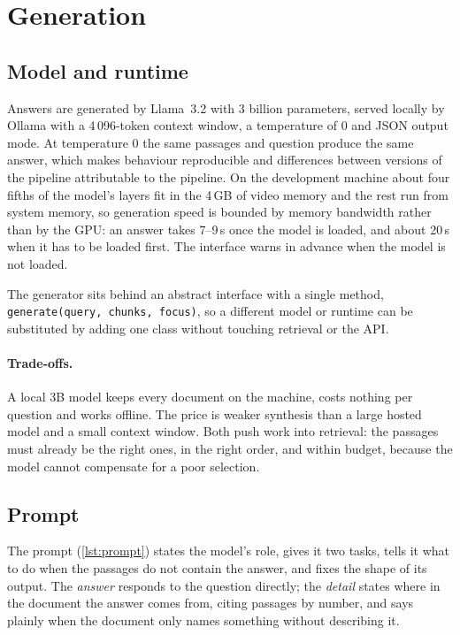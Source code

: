 \section{Generation}
\label{sec:generation}

\subsection{Model and runtime}

Answers are generated by Llama~3.2 with 3 billion parameters, served locally by
Ollama with a 4\,096-token context window, a temperature of 0 and JSON output
mode. At temperature 0 the same passages and question produce the same answer,
which makes behaviour reproducible and differences between versions of the
pipeline attributable to the pipeline. On the development machine about four
fifths of the model's layers fit in the 4\,GB of video memory and the rest run
from system memory, so generation speed is bounded by memory bandwidth rather
than by the GPU: an answer takes 7--9\,s once the model is loaded, and about
20\,s when it has to be loaded first. The interface warns in advance when the
model is not loaded.

The generator sits behind an abstract interface with a single method,
\texttt{generate(query, chunks, focus)}, so a different model or runtime can
be substituted by adding one class without touching retrieval or the API.

\paragraph{Trade-offs.} A local 3B model keeps every document on the machine,
costs nothing per question and works offline. The price is weaker synthesis
than a large hosted model and a small context window. Both push work into
retrieval: the passages must already be the right ones, in the right order,
and within budget, because the model cannot compensate for a poor selection.

\subsection{Prompt}

The prompt (\cref{lst:prompt}) states the model's role, gives it two tasks,
tells it what to do when the passages do not contain the answer, and fixes the
shape of its output. The \emph{answer} responds to the question directly; the
\emph{detail} states where in the document the answer comes from, citing
passages by number, and says plainly when the document only names something
without describing it.

